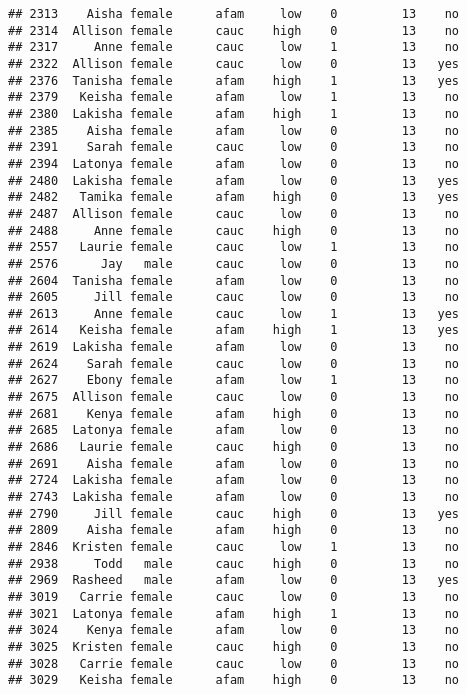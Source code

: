 \documentclass[
]{article}
\begin{document}
\begin{verbatim}
## 2313    Aisha female      afam     low    0         13    no
## 2314  Allison female      cauc    high    0         13    no
## 2317     Anne female      cauc     low    1         13    no
## 2322  Allison female      cauc     low    0         13   yes
## 2376  Tanisha female      afam    high    1         13   yes
## 2379   Keisha female      afam     low    1         13    no
## 2380  Lakisha female      afam    high    1         13    no
## 2385    Aisha female      afam     low    0         13    no
## 2391    Sarah female      cauc     low    0         13    no
## 2394  Latonya female      afam     low    0         13    no
## 2480  Lakisha female      afam     low    0         13   yes
## 2482   Tamika female      afam    high    0         13   yes
## 2487  Allison female      cauc     low    0         13    no
## 2488     Anne female      cauc    high    0         13    no
## 2557   Laurie female      cauc     low    1         13    no
## 2576      Jay   male      cauc     low    0         13    no
## 2604  Tanisha female      afam     low    0         13    no
## 2605     Jill female      cauc     low    0         13    no
## 2613     Anne female      cauc     low    1         13   yes
## 2614   Keisha female      afam    high    1         13   yes
## 2619  Lakisha female      afam     low    0         13    no
## 2624    Sarah female      cauc     low    0         13    no
## 2627    Ebony female      afam     low    1         13    no
## 2675  Allison female      cauc     low    0         13    no
## 2681    Kenya female      afam    high    0         13    no
## 2685  Latonya female      afam     low    0         13    no
## 2686   Laurie female      cauc    high    0         13    no
## 2691    Aisha female      afam     low    0         13    no
## 2724  Lakisha female      afam     low    0         13    no
## 2743  Lakisha female      afam     low    0         13    no
## 2790     Jill female      cauc    high    0         13   yes
## 2809    Aisha female      afam    high    0         13    no
## 2846  Kristen female      cauc     low    1         13    no
## 2938     Todd   male      cauc    high    0         13    no
## 2969  Rasheed   male      afam     low    0         13   yes
## 3019   Carrie female      cauc     low    0         13    no
## 3021  Latonya female      afam    high    1         13    no
## 3024    Kenya female      afam     low    0         13    no
## 3025  Kristen female      cauc    high    0         13    no
## 3028   Carrie female      cauc     low    0         13    no
## 3029   Keisha female      afam    high    0         13    no

\end{verbatim}
\end{document}
